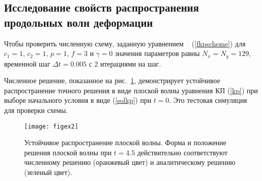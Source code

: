 \subsection{Исследование свойств распространения продольных волн деформации}

Чтобы проверить численную схему, заданную уравнением ~ (\ref {fkpscheme}) для $c_1 = 1$, $c_2 = 1$, $p = 1$, $f = 3$ и $\gamma = 0$ значения параметров равны $N_x = N_y = 129$, временной шаг $\Delta t = 0.005$ с 2 итерациями на шаг.

Численное решение, показанное на рис.~\ref{figex2}, демонстрирует устойчивое распространение точного решения в виде плоской волны уравнения КП (\ref {kp}) при выборе начального условия в виде (\ref{solkp}) при $t = 0$. Это тестовая симуляция для проверки схемы.

\begin{figure}
	\centering
	\texttt{[image: figex2]}
	\caption{Устойчивое распространение плоской волны. Форма и положение решения плоской волны при $ t = 4.5 $ действительно соответствуют численному решению (оранжевый цвет) и аналитическому решению (зеленый цвет).}\label{figex2}	
\end{figure}

